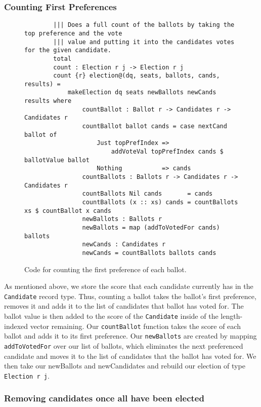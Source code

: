 \subsubsection{Counting First Preferences}

\begin{figure}[ht!!!!!!!!]
	\caption{Code for counting the first preference of each ballot.}
	\label{counting_code}
    \begin{lstlisting}
        ||| Does a full count of the ballots by taking the top preference and the vote
        ||| value and putting it into the candidates votes for the given candidate. 
        total
        count : Election r j -> Election r j
        count {r} election@(dq, seats, ballots, cands, results) = 
            makeElection dq seats newBallots newCands results where
                countBallot : Ballot r -> Candidates r -> Candidates r
                countBallot ballot cands = case nextCand ballot of
                    Just topPrefIndex => 
                        addVoteVal topPrefIndex cands $ ballotValue ballot
                    Nothing           => cands
                countBallots : Ballots r -> Candidates r -> Candidates r
                countBallots Nil cands       = cands
                countBallots (x :: xs) cands = countBallots xs $ countBallot x cands
                newBallots : Ballots r
                newBallots = map (addToVotedFor cands) ballots
                newCands : Candidates r
                newCands = countBallots ballots cands
    \end{lstlisting}
\end{figure}

As mentioned above, we store the score that each candidate currently has in the
\texttt{Candidate} record type. Thus, counting a ballot takes the ballot's first
preference, removes it and adds it to the list of candidates that ballot has
voted for. The ballot value is then added to the score of the \texttt{Candidate}
inside of the length-indexed vector remaining. Our \texttt{countBallot} function
takes the score of each ballot and adds it to its first preference. Our
\texttt{newBallots} are created by mapping \texttt{addToVotedFor} over our list
of ballots, which eliminates the next preferenced candidate and moves it to the
list of candidates that the ballot has voted for. We then take our newBallots
and newCandidates and rebuild our election of type \texttt{Election r j}. 

\subsubsection{Removing candidates once all have been elected}

